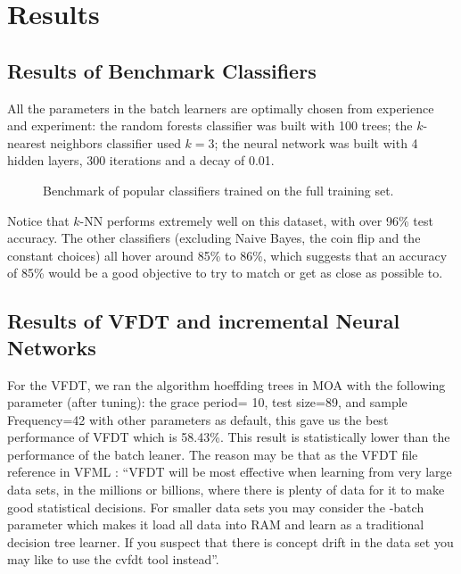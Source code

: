 \documentclass[conference]{IEEEtran}
\begin{document}
		\section{Results}
		\label{sec:experiments-and-results}
		
		\subsection{Results of Benchmark Classifiers}
		All the parameters in the batch learners are optimally chosen from experience and experiment: the random forests classifier was built with 100 trees; the $k$-nearest neighbors classifier used $k=3$; the neural network was built with 4 hidden layers, 300 iterations and a decay of 0.01.
		
		\begin{figure}[H]
			\centering
			\caption{Benchmark of popular classifiers trained on the full training set.}
			\label{fig:benchmark}
		\end{figure}
		
		Notice that $k$-NN performs extremely well on this dataset, with over 96\% test accuracy. The other classifiers (excluding Naive Bayes, the coin flip and the constant choices) all hover around 85\% to 86\%, which suggests that an accuracy of 85\% would be a good objective to try to match or get as close as possible to.
		
		\subsection{Results of VFDT and incremental Neural Networks}
		For the VFDT, we ran the algorithm hoeffding trees in MOA with the following parameter (after tuning): the grace period= 10, test size=89, and sample Frequency=42 with other parameters as default, this gave us the best performance of VFDT which is 58.43\%. This result is statistically lower than the performance of the batch leaner.
		The reason may be that as the VFDT file reference in VFML \cite{VFML}: ``VFDT  will be most effective when learning from very large data sets, in the millions or billions, where there is plenty of data for it to make good statistical decisions. For smaller data sets you may consider the -batch parameter which makes it load all data into RAM and learn as a traditional decision tree learner. If you suspect that there is concept drift in the data set you may like to use the cvfdt tool instead''.
		
\end{document}
